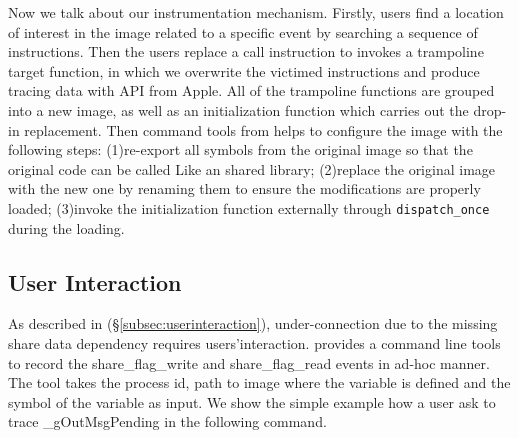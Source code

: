 Now we talk about our instrumentation mechanism. Firstly, users find a location
of interest in the image related to a specific event by searching a sequence of
instructions. Then the users replace a call instruction to invokes a trampoline
target function, in which we overwrite the victimed instructions and produce
tracing data with API from Apple. All of the trampoline functions are grouped
into a new image, as well as an initialization function which carries out the
drop-in replacement. Then command tools from \xxx helps to configure the image
with the following steps: (1)re-export all symbols from the original image so
that the original code can be called Like an shared library; (2)replace the
original image with the new one by renaming them to ensure the modifications
are properly loaded; (3)invoke the initialization function externally through
\texttt{dispatch\_once} during the loading.


\subsection{User Interaction} \label{subsec:tcp}


As described in (\S\ref{subsec:userinteraction}), under-connection due to
the missing share data dependency requires users'interaction. \xxx provides
a command line tools to record the share\_flag\_write and share\_flag\_read
events in ad-hoc manner. The tool takes the process id, path to image where the
variable is defined and the symbol of the variable as input. We show the simple
example how a user ask \xxx to trace \_gOutMsgPending in the following command.

